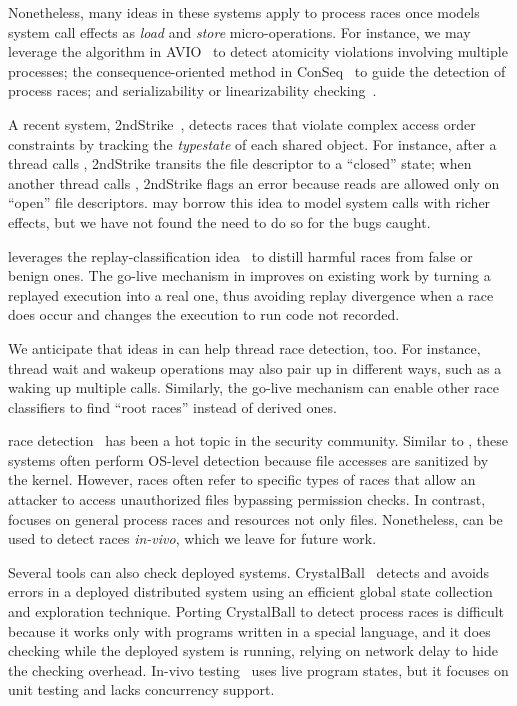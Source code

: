 Nonetheless, many ideas in these systems apply to process races once \racepro
models system call effects as \emph{load} and \emph{store} micro-operations. 
For instance, we may leverage the algorithm in AVIO~\cite{avio:asplos06} to
detect atomicity violations involving multiple processes; the
consequence-oriented method in ConSeq~\cite{conseq:asplos11} to guide the
detection of process races; and serializability or linearizability
checking~\cite{linearizable:eurosys11}.

A recent system, 2ndStrike~\cite{2ndstrike:asplos11}, detects races that
violate complex access order constraints by tracking the \emph{typestate}
of each shared object.  For instance, after a thread calls ,
2ndStrike transits the file descriptor to a ``closed'' state; when another
thread calls , 2ndStrike flags an error because reads are
allowed only on ``open'' file descriptors.  \racepro may borrow this idea to
model system calls with richer effects, but we have not found the need to
do so for the bugs \racepro caught.

\racepro leverages the replay-classification idea~\cite{pinsel:pldi07} to
distill harmful races from false or benign ones.  The go-live mechanism in
\racepro improves on existing work by turning a replayed execution into a
real one, thus avoiding replay divergence when a race does occur and
changes the execution to run code not recorded.

We anticipate that ideas in \racepro can help thread race detection, too.  For
instance, thread wait and wakeup operations may also pair up in different
ways, such as a  waking up multiple
 calls.  Similarly, the go-live mechanism can
enable other race classifiers to find ``root races'' instead of derived
ones.

  

 \toctou race
detection~\cite{toctou:fast08,toctou:usec03,toctou:fast05} has been a hot
topic in the security community.  Similar to \racepro, these systems often
perform OS-level detection because file accesses are sanitized by the
kernel.  However, \toctou races often refer to specific types of races that
allow an attacker to access unauthorized files bypassing permission
checks.  In contrast, \racepro focuses on general process races and resources
not only files.  Nonetheless, \racepro can be used to detect \toctou races
\emph{in-vivo}, which we leave for future work.

  Several tools can also check deployed
systems.  CrystalBall~\cite{crystalball:nsdi09} detects and avoids errors
in a deployed distributed system using an efficient global state
collection and exploration technique.  Porting CrystalBall to detect
process races is difficult because it works only with programs written in
a special language, and it does checking while the deployed system is
running, relying on network delay to hide the checking overhead.  In-vivo
testing~\cite{in-vivo-testing} uses live program states, but it focuses on
unit testing and lacks concurrency support.

